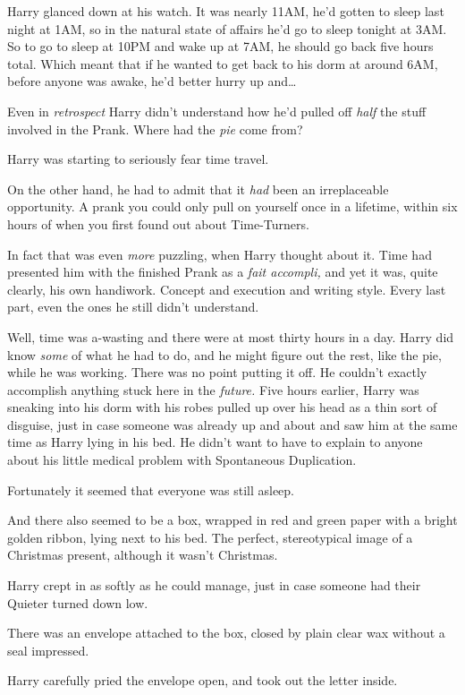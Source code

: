 Harry glanced down at his watch. It was nearly 11AM, he'd gotten to sleep last night at 1AM, so in the natural state of affairs he'd go to sleep tonight at 3AM. So to go to sleep at 10PM and wake up at 7AM, he should go back five hours total. Which meant that if he wanted to get back to his dorm at around 6AM, before anyone was awake, he'd better hurry up and{\ldots}

Even in \emph{retrospect} Harry didn't understand how he'd pulled off \emph{half} the stuff involved in the Prank. Where had the \emph{pie} come from?

Harry was starting to seriously fear time travel.

On the other hand, he had to admit that it \emph{had} been an irreplaceable opportunity. A prank you could only pull on yourself once in a lifetime, within six hours of when you first found out about Time-Turners.

In fact that was even \emph{more} puzzling, when Harry thought about it. Time had presented him with the finished Prank as a \emph{fait accompli,} and yet it was, quite clearly, his own handiwork. Concept and execution and writing style. Every last part, even the ones he still didn't understand.

Well, time was a-wasting and there were at most thirty hours in a day. Harry did know \emph{some} of what he had to do, and he might figure out the rest, like the pie, while he was working. There was no point putting it off. He couldn't exactly accomplish anything stuck here in the \emph{future.}
\sbreak
Five hours earlier, Harry was sneaking into his dorm with his robes pulled up over his head as a thin sort of disguise, just in case someone was already up and about and saw him at the same time as Harry lying in his bed. He didn't want to have to explain to anyone about his little medical problem with Spontaneous Duplication.

Fortunately it seemed that everyone was still asleep.

And there also seemed to be a box, wrapped in red and green paper with a bright golden ribbon, lying next to his bed. The perfect, stereotypical image of a Christmas present, although it wasn't Christmas.

Harry crept in as softly as he could manage, just in case someone had their Quieter turned down low.

There was an envelope attached to the box, closed by plain clear wax without a seal impressed.

Harry carefully pried the envelope open, and took out the letter inside.

